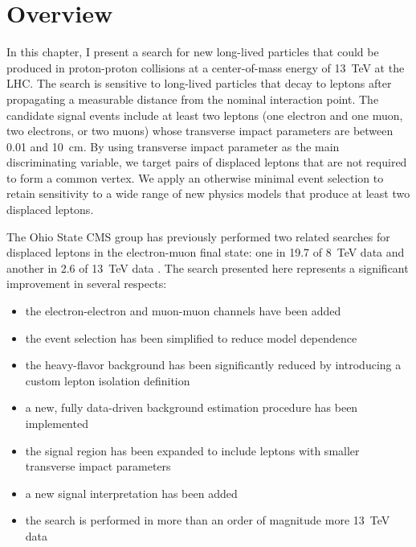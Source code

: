 \section{Overview}
\label{overview}
In this chapter, I present a search for new long-lived particles that could be produced in proton-proton collisions at a center-of-mass energy of \SI{13}{\TeV} at the LHC. The search is sensitive to long-lived particles that decay to leptons after propagating a measurable distance from the nominal interaction point. The candidate signal events include at least two leptons (one electron and one muon, two electrons, or two muons) whose transverse impact parameters are between \num{0.01} and \SI{10}{\cm}. By using transverse impact parameter as the main discriminating variable, we target pairs of displaced leptons that are not required to form a common vertex. We apply an otherwise minimal event selection to retain sensitivity to a wide range of new physics models that produce at least two displaced leptons.

The Ohio State CMS group has previously performed two related searches for displaced leptons in the electron-muon final state: one in \SI{19.7}{\fb} of \SI{8}{\TeV} data and another in \SI{2.6}{\fb} of \SI{13}{\TeV} data \cite{displaced_leptons_run1, displaced_leptons_bing}. The search presented here represents a significant improvement in several respects:
\begin{itemize}
    \item the electron-electron and muon-muon channels have been added
    \item the event selection has been simplified to reduce model dependence
    \item the heavy-flavor background has been significantly reduced by introducing a custom lepton isolation definition
    \item a new, fully data-driven background estimation procedure has been implemented
    \item the signal region has been expanded to include leptons with smaller transverse impact parameters
    \item a new signal interpretation has been added
    \item the search is performed in more than an order of magnitude more \SI{13}{\TeV} data
\end{itemize}




